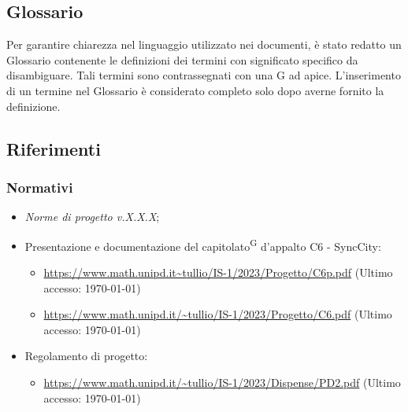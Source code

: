 \documentclass[8pt]{article}
\newcommand{\glossterm}[1]{#1\textsuperscript{G}} %
\begin{document}
\subsection{Glossario}
Per garantire chiarezza nel linguaggio utilizzato nei documenti, è stato redatto un Glossario contenente le definizioni dei termini con significato specifico da disambiguare. Tali termini sono contrassegnati con una G ad apice. L'inserimento di un termine nel Glossario è considerato completo solo dopo averne fornito la definizione.
\subsection{Riferimenti}
\subsubsection{Normativi}
\begin{itemize}
	\item \textit{Norme di progetto v.X.X.X};
	\item Presentazione e documentazione del \glossterm{capitolato} d’appalto C6 - SyncCity:
	\begin{itemize}
		\item \href{https://www.math.unipd.it/~tullio/IS-1/2023/Progetto/C6p.pdf}{\color{myblue}https://www.math.unipd.it\textasciitilde{}tullio/IS-1/2023/Progetto/C6p.pdf} (Ultimo accesso: \today)
		\item \href{https://www.math.unipd.it/~tullio/IS-1/2023/Progetto/C6.pdf}{\color{myblue}https://www.math.unipd.it/\textasciitilde{}tullio/IS-1/2023/Progetto/C6.pdf} (Ultimo accesso: \today)
	\end{itemize}
	\item Regolamento di progetto:
	\begin{itemize}
		\item \href{https://www.math.unipd.it/~tullio/IS-1/2023/Dispense/PD2.pdf}{\color{myblue}https://www.math.unipd.it/\textasciitilde{}tullio/IS-1/2023/Dispense/PD2.pdf} (Ultimo accesso: \today)
	\end{itemize}
\end{itemize}
\clearpage
\end{document}

